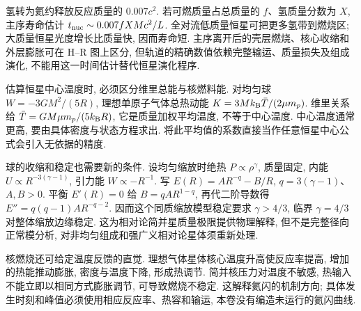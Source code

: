 氢转为氦约释放反应质量的 $0.007c^2$. 若可燃质量占总质量的 $f$、氢质量分数为 $X$, 主序寿命估计 $t_{\rm nuc}\sim0.007fXM c^2/L$. 全对流低质量恒星可把更多氢带到燃烧区; 大质量恒星光度增长比质量快, 因而寿命短. 主序离开后的壳层燃烧、核心收缩和外层膨胀可在 H--R 图上区分, 但轨道的精确数值依赖完整输运、质量损失及组成演化, 不能用这一时间估计替代恒星演化程序.

估算恒星中心温度时, 必须区分维里总能与核燃料能. 对均匀球 $W=-3GM^2/(5R)$, 理想单原子气体总热动能 $K=3Mk_{\mathrm B}\bar T/(2\mu m_p)$. 维里关系给 $\bar T=GM\mu m_p/(5k_{\mathrm B} R)$, 它是质量加权平均温度, 不等于中心温度. 中心温度通常更高, 要由具体密度与状态方程求出. 将此平均值的系数直接当作任意恒星中心公式会引入无依据的精度.

球的收缩和稳定也需要新的条件. 设均匀缩放时绝热 $P\propto\rho^\gamma$, 质量固定, 内能 $U\propto R^{-3(\gamma-1)}$, 引力能 $W\propto-R^{-1}$. 写 $E(R)=A R^{-q}-B/R$, $q=3(\gamma-1)$、$A,B>0$. 平衡 $E'(R)=0$ 给 $B=qA R^{1-q}$, 再代二阶导数得 $E''=q(q-1)A R^{-q-2}$. 因而这个同质缩放模型稳定要求 $\gamma>4/3$, 临界 $\gamma=4/3$ 对整体缩放边缘稳定. 这为相对论简并星质量极限提供物理解释, 但不是完整径向正常模分析, 对非均匀组成和强广义相对论星体须重新处理.

核燃烧还可给定温度反馈的直觉. 理想气体星体核心温度升高使反应率提高, 增加的热能推动膨胀, 密度与温度下降, 形成热调节. 简并核压力对温度不敏感, 热输入不能立即以相同方式膨胀调节, 可导致燃烧不稳定. 这解释氦闪的机制方向; 具体发生时刻和峰值必须使用相应反应率、热容和输运, 本卷没有编造未运行的氦闪曲线.
